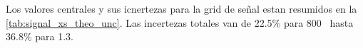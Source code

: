 

Los valores centrales y sus icnertezas para la grid de se\~nal
estan resumidos en la \cref{tab:signal_xs_theo_unc}.
Las incertezas totales van de 22.5\% para 800 \GeV\ hasta 36.8\% para 1.3\TeV.

